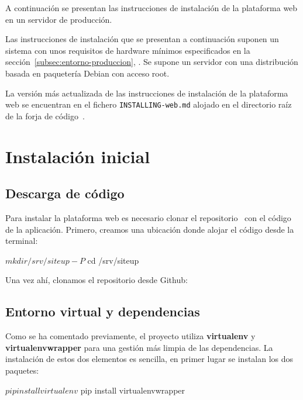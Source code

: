 A continuación se presentan las instrucciones de instalación de la plataforma
web en un servidor de producción.

Las instrucciones de instalación que se presentan a continuación suponen un
sistema con unos requisitos de hardware mínimos especificados en la
sección~\ref{subsec:entorno-produccion},
\textit{}. Se supone un servidor con una
distribución basada en paquetería Debian con acceso root.

La versión más actualizada de las instrucciones de instalación de la plataforma
web se encuentran en el fichero \texttt{INSTALLING-web.md} alojado en el
directorio raíz de la forja de código~\cite{forja}.

\section{Instalación inicial}

\subsection{Descarga de código}

Para instalar la plataforma web es necesario clonar el repositorio~\cite{forja}
con el código de la aplicación. Primero, creamos una ubicación donde alojar el
código desde la terminal:

\begin{bashcode}
$ mkdir /srv/siteup -P  
$ cd /srv/siteup
\end{bashcode}

Una vez ahí, clonamos el repositorio desde Github:


\subsection{Entorno virtual y dependencias}

Como se ha comentado previamente, el proyecto utiliza \textbf{virtualenv} y
\textbf{virtualenvwrapper} para una gestión más limpia de las dependencias. La
instalación de estos dos elementos es sencilla, en primer lugar se instalan los
dos paquetes:

\begin{bashcode}
$ pip install virtualenv
$ pip install virtualenvwrapper
\end{bashcode}

